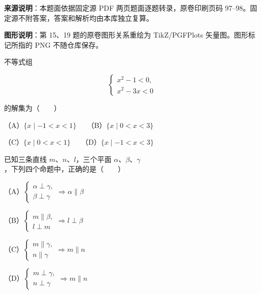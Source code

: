 


\begin{gktip}
\textbf{来源说明}：本题面依据固定源 PDF 两页题面逐题转录，原卷印刷页码 97–98。固定源不附答案，答案和解析均由本库独立复算。

\textbf{图形说明}：第 15、19 题的原卷图形关系重绘为 TikZ/PGFPlots 矢量图。图形标记所指的 PNG 不随仓库保存。
\end{gktip}


\begin{question}
不等式组

\nopagebreak[4]
\[
\begin{cases}
x^2-1<0,\\
x^2-3x<0
\end{cases}
\]

的解集为\mbox{（　　）}

（A）$\{x\mid -1<x<1\}$　　（B）$\{x\mid 0<x<3\}$

（C）$\{x\mid 0<x<1\}$　　（D）$\{x\mid -1<x<3\}$

\end{question}
\begin{question}
已知三条直线 $m\text{、}n\text{、}l$，三个平面 $\alpha\text{、}\beta\text{、}\gamma$，下列四个命题中，正确的是\mbox{（　　）}

（A）$\begin{cases}\alpha\perp\gamma,\\ \beta\perp\gamma\end{cases}\Rightarrow\alpha\parallel\beta$

（B）$\begin{cases}m\parallel\beta,\\ l\perp m\end{cases}\Rightarrow l\perp\beta$

（C）$\begin{cases}m\parallel\gamma,\\ n\parallel\gamma\end{cases}\Rightarrow m\parallel n$

（D）$\begin{cases}m\perp\gamma,\\ n\perp\gamma\end{cases}\Rightarrow m\parallel n$

\end{question}
